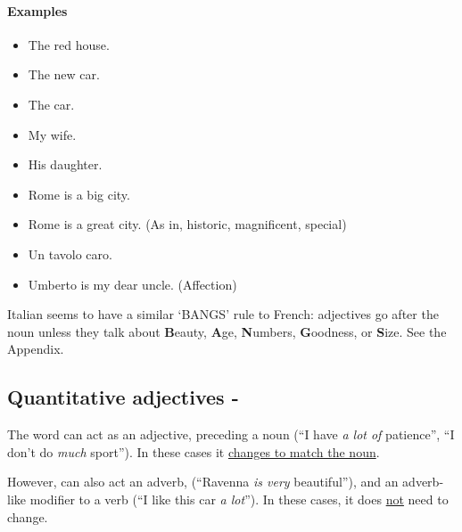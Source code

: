 \paragraph{Examples}
\begin{itemize}
    \item The red house. \\
    \item The new car. \\
    \item The  car. \\
    \item My wife. \\
    \item His daughter. \\
    \item Rome is a big city. \\
    \item Rome is a great city. (As in, historic, magnificent, special)\\
    \item Un tavolo caro. \\
    \item Umberto is my dear uncle. (Affection)\\
\end{itemize}
\begin{mdframed}
    Italian seems to have a similar `BANGS' rule to French: adjectives go after the noun 
	unless they talk about \textbf{B}eauty, \textbf{A}ge, \textbf{N}umbers, 
	\textbf{G}oodness, or \textbf{S}ize. See the Appendix.
\end{mdframed}
\subsection{Quantitative adjectives - }
The word  can act as an adjective, preceding a noun (``I have \textit{a lot of} 
	patience'', ``I don't do \textit{much} sport''). In these cases it \uline{changes 
	to match the noun}.

However,  can also act an adverb, (``Ravenna \textit{is very} beautiful''), 
	and an adverb-like modifier to a verb (``I like this car \textit{a lot}''). 
	In these cases, it does \uline{not} need to change.
